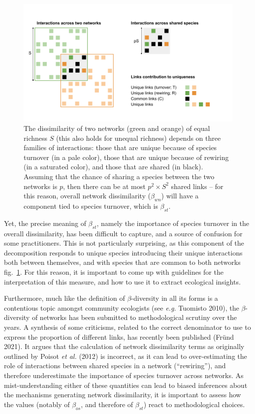 \documentclass[10pt,oneside]{article}
\makeatletter
\def\maxwidth{\ifdim\Gin@nat@width>\linewidth\linewidth
\else\Gin@nat@width\fi}
\let\Oldincludegraphics\includegraphics
\renewcommand{\includegraphics}[1]{\Oldincludegraphics[width=\maxwidth]{#1}}
\makeatother
\begin{document}
\begin{figure}
\hypertarget{fig:conceptual}{%
\centering
\includegraphics{figures/betadiv_response_figure.png}
\caption{The dissimilarity of two networks (green and orange) of equal
richness \(S\) (this also holds for unequal richness) depends on three
families of interactions: those that are unique because of species
turnover (in a pale color), those that are unique because of rewiring
(in a saturated color), and those that are shared (in black). Assuming
that the chance of sharing a species between the two networks is \(p\),
then there can be at most \(p^2\times S^2\) shared links -- for this
reason, overall network dissimilarity (\(\beta_{wn}\)) will have a
component tied to species turnover, which is
\(\beta_{st}\).}\label{fig:conceptual}
}
\end{figure}

Yet, the precise meaning of \(\beta_{st}\), namely the importance of
species turnover in the overall dissimilarity, has been difficult to
capture, and a source of confusion for some practitioners. This is not
particularly surprising, as this component of the decomposition responds
to unique species introducing their unique interactions both between
themselves, and with species that are common to both networks
fig.~\ref{fig:conceptual}. For this reason, it is important to come up
with guidelines for the interpretation of this measure, and how to use
it to extract ecological insights.

Furthermore, much like the definition of \(\beta\)-diversity in all its
forms is a contentious topic amongst community ecologists (see
\emph{e.g.} Tuomisto 2010), the \(\beta\)-diversity of networks has been
submitted to methodological scrutiny over the years. A synthesis of some
criticisms, related to the correct denominator to use to express the
proportion of different links, has recently been published (Fründ 2021).
It argues that the calculation of network dissimilarity terms as
originally outlined by Poisot \emph{et al.} (2012) is incorrect, as it
can lead to over-estimating the role of interactions between shared
species in a network (``rewiring''), and therefore underestimate the
importance of species turnover across networks. As mist-understanding
either of these quantities can lead to biased inferences about the
mechanisms generating network dissimilarity, it is important to assess
how the values (notably of \(\beta_{os}\), and therefore of
\(\beta_{st}\)) react to methodological choices.
\end{document}
